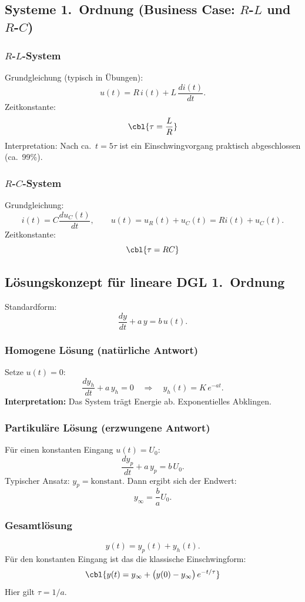 \subsection{Systeme 1.\ Ordnung (Business Case: $R$-$L$ und $R$-$C$)}

\subsubsection{$R$-$L$-System}
Grundgleichung (typisch in Übungen):
\[
u(t)=R\,i(t)+L\,\frac{di(t)}{dt}.
\]
Zeitkonstante:
\[
\cbl{\tau=\frac{L}{R}}
\]
Interpretation: Nach ca.\ $t=5\tau$ ist ein Einschwingvorgang praktisch abgeschlossen (ca.\ 99\%).

\subsubsection{$R$-$C$-System}
Grundgleichung:
\[
i(t)=C\frac{du_C(t)}{dt},\qquad u(t)=u_R(t)+u_C(t)=R i(t)+u_C(t).
\]
Zeitkonstante:
\[
\cbl{\tau=R C}
\]

\subsection{Lösungskonzept für lineare DGL 1.\ Ordnung}

Standardform:
\[
\frac{dy}{dt}+a\,y=b\,u(t).
\]

\subsubsection{Homogene Lösung (natürliche Antwort)}
Setze $u(t)=0$:
\[
\frac{dy_h}{dt}+a\,y_h=0 \quad \Rightarrow \quad y_h(t)=K\,e^{-a t}.
\]
\textbf{Interpretation:} Das System trägt Energie ab. Exponentielles Abklingen.

\subsubsection{Partikuläre Lösung (erzwungene Antwort)}
Für einen konstanten Eingang $u(t)=U_0$:
\[
\frac{dy_p}{dt}+a\,y_p=b\,U_0.
\]
Typischer Ansatz: $y_p=\text{konstant}$.
Dann ergibt sich der Endwert:
\[
y_\infty=\frac{b}{a}U_0.
\]

\subsubsection{Gesamtlösung}
\[
y(t)=y_p(t)+y_h(t).
\]
Für den konstanten Eingang ist das die klassische Einschwingform:
\[
\cbl{y(t)=y_\infty + \big(y(0)-y_\infty\big)\,e^{-t/\tau}}
\]
Hier gilt $\tau=1/a$.

